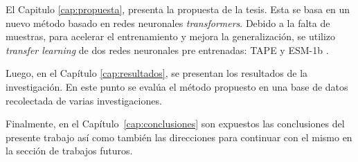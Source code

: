 El Capitulo \ref{cap:propuesta}, presenta la propuesta de la tesis. Esta se basa en un nuevo método basado en redes neuronales \textit{transformers}. Debido a la falta de muestras, para acelerar el entrenamiento y mejora la generalización, se utilizo \textit{transfer learning} de dos redes neuronales pre entrenadas: TAPE \citep{rao2019evaluating} y ESM-1b \citep{rives2021biological}.

Luego, en el Capítulo  \ref{cap:resultados}, se presentan los resultados de la investigación. En este punto se evalúa el método propuesto en una base de datos recolectada de varias investigaciones.

Finalmente, en el Capítulo~\ref{cap:conclusiones} son expuestos las conclusiones del presente trabajo así como también las direcciones para continuar con el mismo en la sección de trabajos futuros.






